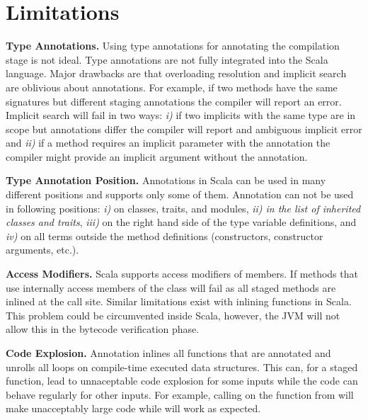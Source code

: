 \section{Limitations}
\label{sct:limitations}

{\bf Type Annotations.} Using type annotations for annotating the compilation stage is not ideal. Type annotations are not fully
 integrated into the Scala language. Major drawbacks are that overloading resolution and implicit search are oblivious about annotations. For example, if two methods have the same signatures but different staging annotations the compiler will report an error. Implicit search will fail in two ways: \emph{i)} if two implicits with the same type are in scope but annotations differ the compiler will report and ambiguous implicit error and \emph{ii)} if a method requires an implicit parameter with the  annotation
 the compiler might provide an implicit argument without the annotation.

{\bf Type Annotation Position.} Annotations in Scala can be used in many different positions and \tool supports only some of them. Annotation  can not be used in following positions: \emph{i)} on classes, traits, and modules, \emph{ii) in the list of inherited classes and traits}, \emph{iii)} on the right hand side of the type variable definitions, and \emph{iv)} on all terms outside the method definitions (constructors, constructor arguments, etc.).

{\bf Access Modifiers.} Scala supports access modifiers of members. If methods that use \tool internally access  members of the class \tool will fail as all staged methods are inlined at the call site. Similar limitations exist with inlining functions in Scala. This problem could be circumvented inside Scala, however, the JVM will not allow this in the bytecode verification phase.

{\bf Code Explosion.} Annotation  inlines all functions that are annotated and unrolls all loops on compile-time executed data structures. This can, for a staged function, lead to unnaceptable code explosion for some inputs while the code can behave regularly for other inputs. For example, calling  on the function from  will make unacceptably large code while  will work as expected.
